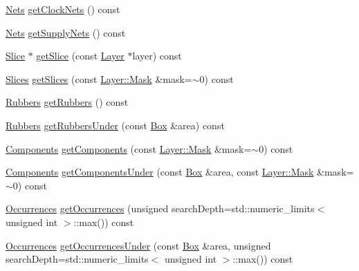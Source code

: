 \begin{DoxyCompactItemize}
\item 
\hyperlink{namespaceHurricane_a3404a8b17130a1824f4a281704b04df7}{Nets} \hyperlink{classHurricane_1_1Cell_a816df8085da555643bbfeafa07c062e5}{get\-Clock\-Nets} () const 
\item 
\hyperlink{namespaceHurricane_a3404a8b17130a1824f4a281704b04df7}{Nets} \hyperlink{classHurricane_1_1Cell_a742917d981594e2b7ce21ee5d2068005}{get\-Supply\-Nets} () const 
\item 
\hyperlink{classHurricane_1_1Slice}{Slice} $\ast$ \hyperlink{classHurricane_1_1Cell_a54a17d776a667cae41c4a89e8fcbc6f4}{get\-Slice} (const \hyperlink{classHurricane_1_1Layer}{Layer} $\ast$layer) const 
\item 
\hyperlink{namespaceHurricane_aa4a7e8a563c5687621eb5e57ade1706a}{Slices} \hyperlink{classHurricane_1_1Cell_a265ad3c40926b63041b8dab77d44908a}{get\-Slices} (const \hyperlink{classHurricane_1_1Layer_af5277c670637bd5d910237e7afe01a91}{Layer\-::\-Mask} \&mask=$\sim$0) const 
\item 
\hyperlink{namespaceHurricane_af8923abd57508cc44931a00d61b564ad}{Rubbers} \hyperlink{classHurricane_1_1Cell_a15dd34e37b9be555f3c221b062874d8e}{get\-Rubbers} () const 
\item 
\hyperlink{namespaceHurricane_af8923abd57508cc44931a00d61b564ad}{Rubbers} \hyperlink{classHurricane_1_1Cell_a3461063138af9caf1a405f6b520f86c6}{get\-Rubbers\-Under} (const \hyperlink{classHurricane_1_1Box}{Box} \&area) const 
\item 
\hyperlink{namespaceHurricane_a7d26d99aeb5dd6d70d51bd35d2473e72}{Components} \hyperlink{classHurricane_1_1Cell_a45e1270e7b87bc762b13885b8e2992db}{get\-Components} (const \hyperlink{classHurricane_1_1Layer_af5277c670637bd5d910237e7afe01a91}{Layer\-::\-Mask} \&mask=$\sim$0) const 
\item 
\hyperlink{namespaceHurricane_a7d26d99aeb5dd6d70d51bd35d2473e72}{Components} \hyperlink{classHurricane_1_1Cell_afe1cda6e4cb65b4187c42e965bfde83a}{get\-Components\-Under} (const \hyperlink{classHurricane_1_1Box}{Box} \&area, const \hyperlink{classHurricane_1_1Layer_af5277c670637bd5d910237e7afe01a91}{Layer\-::\-Mask} \&mask=$\sim$0) const 
\item 
\hyperlink{namespaceHurricane_a1912927c128eee859af62dbe4cbe0a6b}{Occurrences} \hyperlink{classHurricane_1_1Cell_aca80de899afae406a0bb68c24d75c6a4}{get\-Occurrences} (unsigned search\-Depth=std\-::numeric\-\_\-limits$<$ unsigned int $>$\-::max()) const 
\item 
\hyperlink{namespaceHurricane_a1912927c128eee859af62dbe4cbe0a6b}{Occurrences} \hyperlink{classHurricane_1_1Cell_a441e2a121e91db7c9385d9eac9a1f0a3}{get\-Occurrences\-Under} (const \hyperlink{classHurricane_1_1Box}{Box} \&area, unsigned search\-Depth=std\-::numeric\-\_\-limits$<$ unsigned int $>$\-::max()) const 

\end{DoxyCompactItemize}
